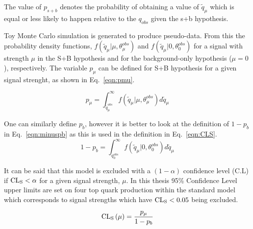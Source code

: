The value of $p_{s+b}$ denotes the probability of obtaining a value of $\tilde{q}_{\mu}$ which is equal or less likely to happen relative to the $q_{obs}$ given the s+b hypothesis.

Toy Monte Carlo simulation is generated to produce pseudo-data. From this the probability density functions, $f\left(\tilde{q}_{\mu} | \mu, \theta^{obs}_{\mu}   \right)$ and $f\left(\tilde{q}_{\mu} |0, \theta^{obs}_{0}   \right) $ for a signal with strength $\mu$ in the S+B hypothesis and for the background-only hypothesis ($\mu=0$), respectively. The variable $p_{\mu}$ can be defined for S+B hypothesis for a given signal strenght, as shown in Eq.~\ref{eqn:pmu}.

\begin{equation}
p_{\mu} = \int_{\tilde{q}_{\mu}^{obs}}^{\infty} f\left(\tilde{q}_{\mu} | \mu, \theta^{obs}_{\mu}   \right) d\tilde{q}_{\mu}
\label{eqn:pmu}
\end{equation}

One can similarly define $p_{b}$, however it is better to look at the definition of $1-p_{b}$ in Eq.~\ref{eqn:minuspb} as this is used in the \CLS definition in Eq.~\ref{eqn:CLS}.
\begin{equation}
1-p_{b} = \int_{q_{0}^{obs}}^{\infty} f\left(\tilde{q}_{\mu} |0, \theta^{obs}_{0}   \right) d\tilde{q}_{\mu}
\label{eqn:minuspb}
\end{equation}

It can be said that this model is excluded with a $\left(1-\alpha \right)$ confidence level (C.L) if ${\textrm{CL}}_{\textrm{S}} < \alpha$ for a given signal strength, $\mu$. In this thesis 95\% Confidence Level upper limits are set on four top quark production within the standard model which corresponds to signal strengths which have ${\textrm{CL}}_{\textrm{S}} < 0.05$ being excluded.

\begin{equation}
{\textrm{CL}}_{\textrm{S}}\left(\mu\right) = \frac{p_{\mu}}{1-p_{b}}
\label{eqn:CLS}
\end{equation}





